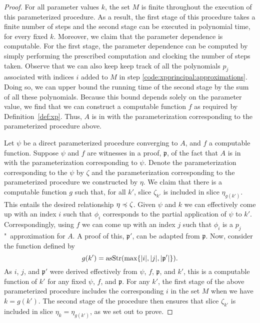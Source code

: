 \begin{proof}
  For all parameter values $k$, the set $M$ is finite throughout the execution of this parameterized procedure.
  As a result, the first stage of this procedure takes a finite number of steps and the second stage can be executed in polynomial time, for every fixed $k$.
  Moreover, we claim that the parameter dependence is computable.
  For the first stage, the parameter dependence can be computed by simply performing the prescribed computation and clocking the number of steps taken.
  Observe that we can also keep keep track of all the polynomials $p_j$ associated with indices $i$ added to $M$ in step \ref{code:xpprincipal:approximations}.
  Doing so, we can upper bound the running time of the second stage by the sum of all these polynomials.
  Because this bound depends solely on the parameter value, we find that we can construct a computable function $f$ as required by Definition~\ref{def:xp}.
  Thus, $A$ is in  with the parameterization corresponding to the parameterized procedure above.

  Let $\psi$ be a direct parameterized procedure converging to $A$, and $f$ a computable function.
  Suppose $\psi$ and $f$ are witnesses in a proof, $\mathfrak{p}$, of the fact that $A$ is in  with the parameterization corresponding to $\psi$.
  Denote the parameterization corresponding to the $\psi$ by $\zeta$ and the parameterization corresponding to the parameterized procedure we constructed by $\eta$.
  We claim that there is a computable function $g$ such that, for all $k'$, slice $\zeta_{k'}$ is included in slice $\eta_{g(k')}$.
  This entails the desired relationship $\eta \preccurlyeq \zeta$.
  Given $\psi$ and $k$ we can effectively come up with an index $i$ such that $\phi_i$ corresponds to the partial application of $\psi$ to $k'$.
  Correspondingly, using $f$ we can come up with an index $j$ such that $\phi_i$ is a $p_j$"~approximation for $A$.
  A proof of this, $\mathfrak{p}'$, can be adapted from $\mathfrak{p}$.
  Now, consider the function defined by
  \begin{equation*}
    g(k') = \operatorname{asStr}(\max\{{\lvert i\rvert}, {\lvert j\rvert}, {\lvert\mathfrak{p}'\rvert}\}).
  \end{equation*}
  As $i$, $j$, and $\mathfrak{p}'$ were derived effectively from $\psi$, $f$, $\mathfrak{p}$, and $k'$, this is a computable function of $k'$ for any fixed $\psi$, $f$, and $\mathfrak{p}$.
  For any $k'$, the first stage of the above parameterized procedure includes the corresponding $i$ in the set $M$ when we have $k = g(k')$.
  The second stage of the procedure then ensures that slice $\zeta_{k'}$ is included in slice $\eta_k = \eta_{g(k')}$, as we set out to prove.
\end{proof}

